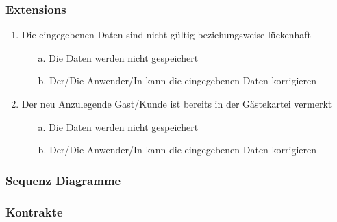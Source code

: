 \documentclass[./detailed_overview_usecases.tex]{subfiles}
\begin{document}
    \subsubsection*{Extensions}
    \begin{enumerate}
        \item Die eingegebenen Daten sind nicht gültig beziehungsweise lückenhaft
        \begin{itemize}
                       \item[a.] Die Daten werden nicht gespeichert
                       \item[b.] Der/Die Anwender/In kann die eingegebenen Daten korrigieren
        \end{itemize}
        \item Der neu Anzulegende Gast/Kunde ist bereits in der Gästekartei vermerkt
        \begin{itemize}
            \item[a.] Die Daten werden nicht gespeichert
            \item[b.] Der/Die Anwender/In kann die eingegebenen Daten korrigieren
        \end{itemize}
    \end{enumerate}

    \subsubsection{Sequenz Diagramme}
    \subsubsection{Kontrakte}
\end{document}
